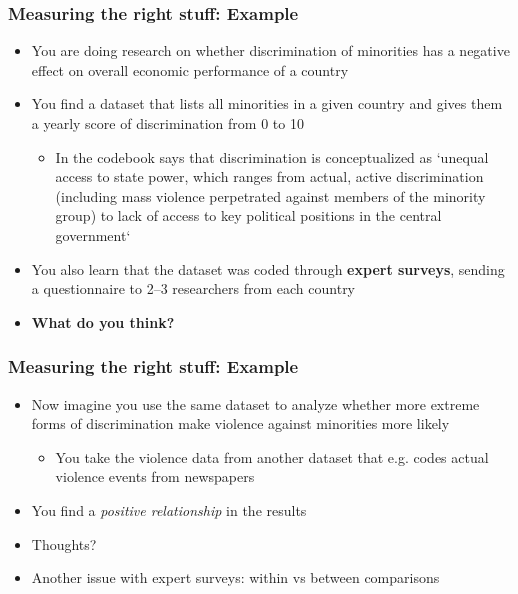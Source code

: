 \documentclass[aspectratio=43]{beamer}
\begin{document}
\begin{frame}
\frametitle{Measuring the right stuff: Example}
\centering

\begin{itemize}
  \item You are doing research on whether discrimination of minorities has a negative effect on overall economic performance of a country
  \item You find a dataset that lists all minorities in a given country and gives them a yearly score of discrimination from 0 to 10
  \begin{itemize}
    \item In the codebook says that discrimination is conceptualized as `unequal access to state power, which ranges from actual, active discrimination (including mass violence perpetrated against members of the minority group) to lack of access to key political positions in the central government`
  \end{itemize}
  \item You also learn that the dataset was coded through \textbf{expert surveys}, sending a questionnaire to 2--3 researchers from each country
  \item \textbf{What do you think?}
\end{itemize}

\end{frame}

\begin{frame}
\frametitle{Measuring the right stuff: Example}
\centering

\begin{itemize}
  \item Now imagine you use the same dataset to analyze whether more extreme forms of discrimination make violence against minorities more likely
  \begin{itemize}
    \item You take the violence data from another dataset that e.g. codes actual violence events from newspapers
  \end{itemize}
  \item You find a \textit{positive relationship} in the results
  \item Thoughts?
  \item<2-> Another issue with expert surveys: within vs between comparisons
\end{itemize}

\end{frame}
\end{document}
